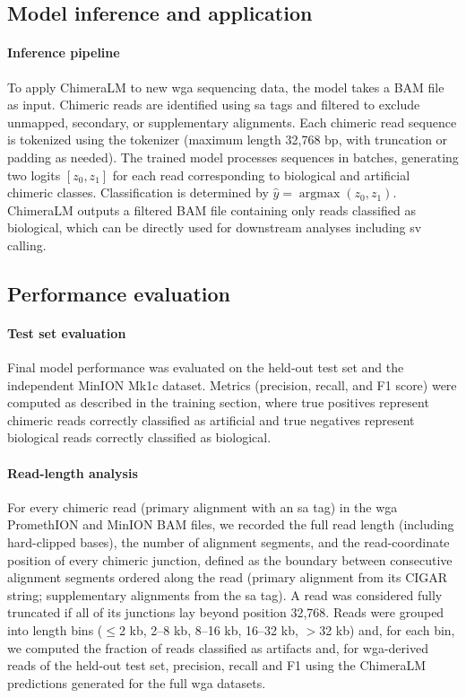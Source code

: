\documentclass[pdflatex,lineno]{sn-jnl}%
\DeclareMathOperator*{\argmax}{argmax}
\newif\ifrevisedtext
\newcommand{\chg}[1]{\ifrevisedtext\textcolor{revcolor}{#1}\else#1\fi}
\begin{document}
\subsection*{Model inference and application}

\paragraph{Inference pipeline}
To apply ChimeraLM to new \gls{wga} sequencing data, the model takes a BAM file as input.
Chimeric reads are identified using \gls{sa} tags and filtered to exclude unmapped, secondary, or supplementary alignments.
Each chimeric read sequence is tokenized using the tokenizer (maximum length 32,768 bp, with truncation or padding as needed).
The trained model processes sequences in batches, generating two logits $[z_0, z_1]$ for each read corresponding to biological and artificial chimeric classes.
Classification is determined by $\hat{y} = \argmax(z_0, z_1)$.
ChimeraLM outputs a filtered BAM file containing only reads classified as biological, which can be directly used for downstream analyses including \gls{sv} calling.

\subsection*{Performance evaluation}

\paragraph{Test set evaluation}
Final model performance was evaluated on the held-out test set and the independent MinION Mk1c dataset.
Metrics (precision, recall, and F1 score) were computed as described in the training section, where true positives represent chimeric reads correctly classified as artificial and true negatives represent biological reads correctly classified as biological.

\paragraph{\chg{Read-length analysis}}
\chg{For every chimeric read (primary alignment with an \gls{sa} tag) in the \gls{wga} PromethION and MinION BAM files, we recorded the full read length (including hard-clipped bases), the number of alignment segments, and the read-coordinate position of every chimeric junction, defined as the boundary between consecutive alignment segments ordered along the read (primary alignment from its CIGAR string; supplementary alignments from the \gls{sa} tag).
	A read was considered fully truncated if all of its junctions lay beyond position 32,768.
	Reads were grouped into length bins ($\leq$2 kb, 2--8 kb, 8--16 kb, 16--32 kb, $>$32 kb) and, for each bin, we computed the fraction of reads classified as artifacts and, for \gls{wga}-derived reads of the held-out test set, precision, recall and F1 using the ChimeraLM predictions generated for the full \gls{wga} datasets.}
\end{document}

